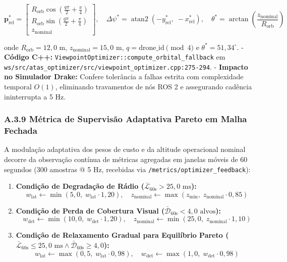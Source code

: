 \documentclass[
  brazilian,
  a4paper]{article}
\providecommand{\tightlist}{%
  \setlength{\itemsep}{0pt}\setlength{\parskip}{0pt}}
\begin{document}
\[\mathbf{p}_{\text{rel}}^* = \begin{bmatrix} R_{\text{orb}} \cos\left(\frac{q \pi}{2} + \frac{\pi}{4}\right) \\ R_{\text{orb}} \sin\left(\frac{q \pi}{2} + \frac{\pi}{4}\right) \\ z_{\text{nominal}} \end{bmatrix}, \quad \Delta\psi^* = \operatorname{atan2}\left(-y_{\text{rel}}^*, \; -x_{\text{rel}}^*\right), \quad \theta^* = \arctan\left(\frac{z_{\text{nominal}}}{R_{\text{orb}}}\right)\]

onde \(R_{\text{orb}} = 12{,}0\text{ m}\),
\(z_{\text{nominal}} = 15{,}0\text{ m}\),
\(q = \text{drone\_id} \pmod 4\) e \(\theta^* = 51{,}34^\circ\). -
\textbf{Código C++:}
\texttt{ViewpointOptimizer:\allowbreak{}:\allowbreak{}compute\_\allowbreak{}orbital\_\allowbreak{}fallback} em
\texttt{ws/\allowbreak{}src/\allowbreak{}atas\_\allowbreak{}optimizer/\allowbreak{}src/\allowbreak{}viewpoint\_\allowbreak{}optimizer.\allowbreak{}cpp:\allowbreak{}275-294}. -
\textbf{Impacto no Simulador Drake:} Confere tolerância a falhas estrita
com complexidade temporal \(O(1)\), eliminando travamentos de nós ROS 2
e assegurando cadência ininterrupta a 5 Hz.

\subsubsection{A.3.9 Métrica de Supervisão Adaptativa Pareto em Malha
Fechada}\label{a.3.9-muxe9trica-de-supervisuxe3o-adaptativa-pareto-em-malha-fechada}

A modulação adaptativa dos pesos de custo e da altitude operacional
nominal decorre da observação contínua de métricas agregadas em janelas
móveis de 60 segundos (300 amostras @ 5 Hz, recebidas via
\texttt{/\allowbreak{}metrics/\allowbreak{}optimizer\_\allowbreak{}feedback}):

\begin{enumerate}
\def\labelenumi{\arabic{enumi}.}
\tightlist
\item
  \textbf{Condição de Degradação de Rádio
  (\(\bar{\mathcal{L}}_{60\text{s}} > 25{,}0\text{ ms}\)):}
  \[w_{\text{lat}} \leftarrow \min\left(5{,}0, \; w_{\text{lat}} \cdot 1{,}20\right), \quad z_{\text{nominal}} \leftarrow \max\left(z_{\text{min}}, \; z_{\text{nominal}} \cdot 0{,}85\right)\]
\item
  \textbf{Condição de Perda de Cobertura Visual
  (\(\bar{\mathcal{D}}_{60\text{s}} < 4{,}0\text{ alvos}\)):}
  \[w_{\text{det}} \leftarrow \min\left(10{,}0, \; w_{\text{det}} \cdot 1{,}20\right), \quad z_{\text{nominal}} \leftarrow \min\left(25{,}0, \; z_{\text{nominal}} \cdot 1{,}10\right)\]
\item
  \textbf{Condição de Relaxamento Gradual para Equilíbrio Pareto
  (\(\bar{\mathcal{L}}_{60\text{s}} \le 25{,}0\text{ ms} \land \bar{\mathcal{D}}_{60\text{s}} \ge 4{,}0\)):}
  \[w_{\text{lat}} \leftarrow \max\left(0{,}5, \; w_{\text{lat}} \cdot 0{,}98\right), \quad w_{\text{det}} \leftarrow \max\left(1{,}0, \; w_{\text{det}} \cdot 0{,}98\right)\]
\end{enumerate}
\end{document}
